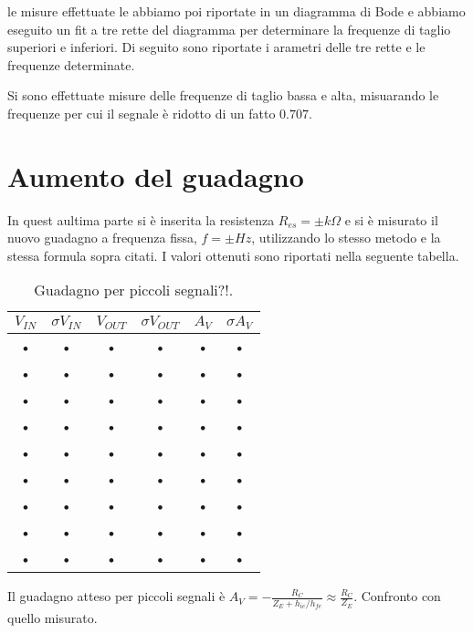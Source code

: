 \documentclass[10pt,a4paper]{article}
\begin{document}
le misure effettuate le abbiamo poi riportate in un diagramma di Bode e abbiamo eseguito un fit a tre rette del diagramma per determinare la frequenze di taglio superiori e inferiori. Di seguito sono riportate i arametri delle tre rette e le frequenze determinate.

Si sono effettuate misure delle frequenze di taglio bassa e alta, misuarando le frequenze per cui il segnale è ridotto di un fatto $0.707$.

\section{Aumento del guadagno}
In quest aultima parte si è inserita la resistenza $R_{es}= \pm k\Omega$ e si è misurato il nuovo guadagno a frequenza fissa, $f= \pm Hz$, utilizzando lo stesso metodo e la stessa formula sopra citati. I valori ottenuti sono riportati nella seguente tabella.

\begin{table}[h]
\centering
\begin{tabular}{|c|c|c|c|c|c|}
\hline 
$V_{IN}$ & $\sigma V_{IN}$ & $V_{OUT}$ & $\sigma V_{OUT}$ & $A_V$ & $\sigma A_V$ \\ 
\hline 
• & • & • & • & • & • \\ 
\hline 
• & • & • & • & • & • \\ 
\hline 
• & • & • & • & • & • \\ 
\hline 
• & • & • & • & • & • \\ 
\hline 
• & • & • & • & • & • \\ 
\hline 
• & • & • & • & • & • \\ 
\hline 
• & • & • & • & • & • \\ 
\hline 
• & • & • & • & • & • \\ 
\hline 
• & • & • & • & • & • \\ 
\hline 
\end{tabular}
\caption{Guadagno per piccoli segnali?!.}
\end{table}

Il guadagno atteso per piccoli segnali è $A_V=-\frac{R_C}{Z_E+h_{ie}/h_{fe}}\approx\frac{R_C}{Z_E}$. Confronto con quello misurato.
\end{document}
